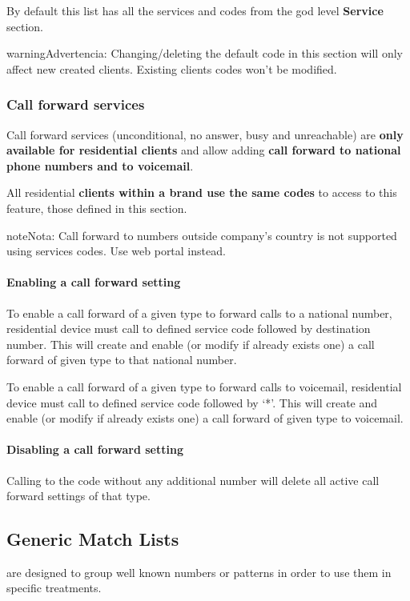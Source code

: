 \documentclass[letterpaper,10pt,spanish]{sphinxmanual}
\begin{document}
By default this list has all the services and codes from the god level \textbf{Service} section.

\begin{notice}{warning}{Advertencia:}
Changing/deleting the default code in this section will only affect new created clients. Existing clients codes won't
be modified.
\end{notice}


\subsubsection{Call forward services}
\label{administration_portal/brand/settings/generic_services:call-forward-services}
Call forward services (unconditional, no answer, busy and unreachable) are \textbf{only available for residential clients}
and allow adding \textbf{call forward to national phone numbers and to voicemail}.

All residential \textbf{clients within a brand use the same codes} to access to this feature, those defined in this section.

\begin{notice}{note}{Nota:}
Call forward to numbers outside company's country is not supported using services codes.
Use web portal instead.
\end{notice}
\paragraph{Enabling a call forward setting}

To enable a call forward of a given type to forward calls to a national number, residential device must call to defined
service code followed by destination number. This will create and enable (or modify if already exists one) a call
forward of given type to that national number.

To enable a call forward of a given type to forward calls to voicemail, residential device must call to defined
service code followed by `*'. This will create and enable (or modify if already exists one) a call
forward of given type to voicemail.
\paragraph{Disabling a call forward setting}

Calling to the code without any additional number will delete all active call forward settings of that type.


\subsection{Generic Match Lists}
\label{administration_portal/brand/settings/generic_match_lists:generic-match-lists}\label{administration_portal/brand/settings/generic_match_lists::doc}\label{administration_portal/brand/settings/generic_match_lists:brand-match-lists}
{\hyperref[administration_portal/client/vpbx/routing_tools/match_lists:match\string-lists]{}} are designed to group well known numbers or patterns in order to use them in specific treatments.
\end{document}
